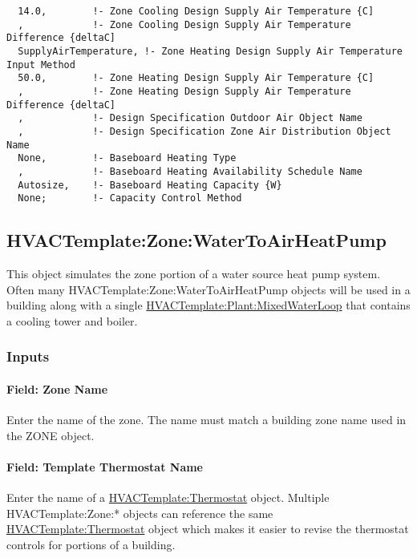 \begin{lstlisting}
  14.0,        !- Zone Cooling Design Supply Air Temperature {C]
  ,            !- Zone Cooling Design Supply Air Temperature Difference {deltaC]
  SupplyAirTemperature, !- Zone Heating Design Supply Air Temperature Input Method
  50.0,        !- Zone Heating Design Supply Air Temperature {C]
  ,            !- Zone Heating Design Supply Air Temperature Difference {deltaC]
  ,            !- Design Specification Outdoor Air Object Name
  ,            !- Design Specification Zone Air Distribution Object Name
  None,        !- Baseboard Heating Type
  ,            !- Baseboard Heating Availability Schedule Name
  Autosize,    !- Baseboard Heating Capacity {W}
  None;        !- Capacity Control Method
\end{lstlisting}

\subsection{HVACTemplate:Zone:WaterToAirHeatPump}\label{hvactemplatezonewatertoairheatpump}

This object simulates the zone portion of a water source heat pump system. Often many HVACTemplate:Zone:WaterToAirHeatPump objects will be used in a building along with a single \hyperref[hvactemplateplantmixedwaterloop]{HVACTemplate:Plant:MixedWaterLoop} that contains a cooling tower and boiler.

\subsubsection{Inputs}\label{inputs-6-011}

\paragraph{Field: Zone Name}\label{field-zone-name-5-001}

Enter the name of the zone. The name must match a building zone name used in the ZONE object.

\paragraph{Field: Template Thermostat Name}\label{field-template-thermostat-name-5}

Enter the name of a \hyperref[hvactemplatethermostat]{HVACTemplate:Thermostat} object. Multiple HVACTemplate:Zone:* objects can reference the same \hyperref[hvactemplatethermostat]{HVACTemplate:Thermostat} object which makes it easier to revise the thermostat controls for portions of a building.

